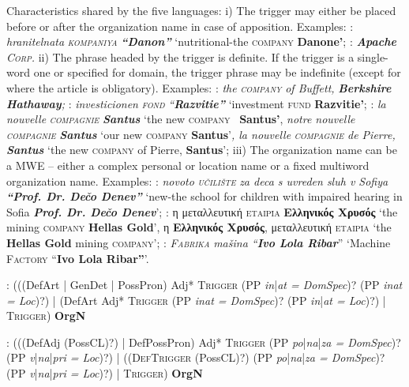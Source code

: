 \documentclass[output=paper]{langsci/langscibook}
\newcommand{\trigger}[1]{\textsc{#1}}
\begin{document}
Characteristics shared by the five languages: i) The trigger may either
be placed before or after the organization name in case of apposition.
Examples: :  \textit{hranitelnata
}\textit{\trigger{kompaniya}}\textit{ }\textbf{\textit{“Danon”}}
‘nutritional-the \trigger{company} \textbf{Danone’}; :
\textbf{\textit{Apache}} \textit{\trigger{Corp.}} ii) The phrase headed
by the trigger is definite. If the trigger is a  single-word one or specified
for domain, the trigger phrase may be indefinite (except for 
where the article is obligatory). Examples: : \textit{the}\trigger{
}\textit{\trigger{company}} \textit{of Buffett,}
\textbf{\textit{Berkshire Hathaway}}\textit{;} :
\textit{investicionen }\textit{\trigger{fond}}\textit{
“}\textbf{\textit{Razvitie”}} ‘investment \trigger{fund}
\textbf{Razvitie’}; : \textit{la nouvelle }\textit{\trigger{compagnie}}
\textbf{\textit{Santus }}‘the new \trigger{company}
\ \textbf{Santus}\textbf{’}, \textit{notre nouvelle
}\textit{\trigger{compagnie}} \textbf{\textit{Santus}} ‘our new
\trigger{company} \textbf{Santus}’\textit{, la nouvelle
}\textit{\trigger{compagnie}} \textit{de Pierre,} \textbf{\textit{Santus
}}‘the new \trigger{company} of Pierre, \textbf{Santus}’; iii) The
organization name can be a 
MWE – either a complex personal or location
name or a fixed multiword organization name. Examples: :
\textit{novoto }\textit{\trigger{učilište}} \textit{za deca s uvreden
sluh v Sofiya }\textbf{\textit{“Prof. Dr. Dečo Denev” }}‘new-the school
for children with impaired hearing in Sofia \textbf{\textit{Prof. Dr.
Dečo Denev}}’; : η μεταλλευτική
\trigger{εταιρία} \textbf{Ελληνικός Χρυσός}
‘the mining \trigger{company} \textbf{Hellas Gold}’, η
\textbf{Ελληνικός Χρυσός}, μεταλλευτική
\trigger{εταιρία} ‘the \textbf{Hellas Gold} mining
\trigger{company}’; : \textit{\trigger{Fabrika}} \textit{mašina
“}\textbf{\textit{Ivo Lola Ribar}}” ‘Machine \trigger{Factory}
“\textbf{Ivo Lola Ribar”}’.



: (((DefArt | GenDet | PossPron) Adj* \trigger{Trigger}\textbf{ }(PP
\textit{in}|\textit{at = DomSpec})? (PP \textit{in}\textit{at = Loc})?) | (DefArt Adj*
\trigger{Trigger}\textbf{ }(PP \textit{in}\textit{at = DomSpec})? (PP
\textit{in}|\textit{at = Loc})?) | \trigger{Trigger}) \textbf{OrgN}



: (((DefAdj (PossCL)?) | DefPossPron) Adj* \trigger{Trigger} (PP
\textit{po}|\textit{na}|\textit{za = DomSpec})? (PP \textit{v}|\textit{na}|\textit{pri = Loc})?) |
((\trigger{DefTrigger} (PossCL)?) (PP \textit{po}|\textit{na}|\textit{za = DomSpec})? (PP
\textit{v}|\textit{na}|\textit{pri = Loc})?) | \trigger{Trigger}) \textbf{OrgN}
\end{document}
